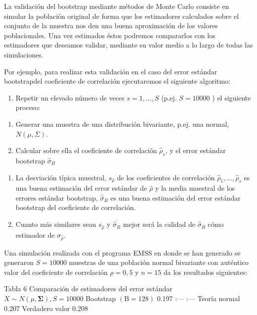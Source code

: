 \documentclass[
]{article}
\providecommand{\tightlist}{%
  \setlength{\itemsep}{0pt}\setlength{\parskip}{0pt}}
\begin{document}
La validación del bootstrap mediante métodos de Monte Carlo consiste en simular la población original de forma que los estimadores calculados sobre el conjunto de la muestra nos den una buena aproximación de los valores poblacionales. Una vez estimados éstos podremos compararlos con los estimadores que deseamos validar, mediante su valor medio a lo largo de todas las simulaciones.

Por ejemplo, para realizar esta validación en el caso del error estándar bootstrapdel coeficiente de correlación ejecutaremos el siguiente algoritmo:

\begin{enumerate}
\def\labelenumi{\arabic{enumi}.}
\tightlist
\item
  Repetir un elevado número de veces \(s=1, \ldots, S\) (p.ej. \(S=10000\) ) el siguiente proceso:
\end{enumerate}

\begin{enumerate}
\def\labelenumi{\alph{enumi})}
\tightlist
\item
  Generar una muestra de una distribución bivariante, p.ej. una normal, \(N(\mu, \Sigma)\).
\item
  Calcular sobre ella el coeficiente de correlación \(\hat{\rho}_{s}\), y el error estándar bootstrap \(\hat{\sigma}_{B}\)
\end{enumerate}

\begin{enumerate}
\def\labelenumi{\arabic{enumi}.}
\setcounter{enumi}{1}
\tightlist
\item
  La desviación típica muestral, \(s_{\hat{\rho}}\) de los coeficientes de correlación \(\hat{\rho}_{1}, \ldots, \hat{\rho}_{s}\) es una buena estimación del error estándar de \(\hat{\rho}\) y la media muestral de los errores estándar bootstrap, \(\overline{\hat{\sigma}}_{B}\) es una buena estimación del error estándar bootstrap del coeficiente de correlación.
\item
  Cuanto más similares sean \(s_{\hat{\rho}}\) y \(\overline{\hat{\sigma}_{B}}\) mejor será la calidad de \(\hat{\sigma}_{B}\) cómo estimador de \(\sigma_{\hat{\rho}}\).
\end{enumerate}

Una simulación realizada con el programa EMSS en donde se han generado se generaron \(S=10000\) muestras de una población normal bivariante con auténtico valor del coeficiente de correlación \(\rho=0,5\) y \(n=15\) da los resultados siguientes:

Tabla 6
Comparación de estimadores del error estándar
\(X \sim N(\mu, \boldsymbol{\Sigma}), S=10000\)
\textbar{} Bootstrap \((\mathrm{B}=128)\) \textbar{} 0.197 \textbar{}
\textbar{} :--- \textbar{} :--- \textbar{}
\textbar{} Teoría normal \textbar{} 0.207 \textbar{}
\textbar{} Verdadero valor \textbar{} 0.208 \textbar{}
\end{document}
